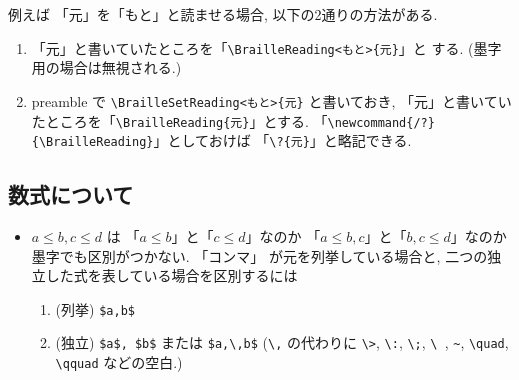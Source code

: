 \documentclass[lualatex,ja=standard,jafont=haranoaji]{bxjsarticle}
\begin{document}
例えば
「元」を「もと」と読ませる場合, 
以下の2通りの方法がある.

\begin{enumerate}
\item 「元」と書いていたところを「\verb|\BrailleReading<もと>{元}|」と
  する. (墨字用の場合は無視される.)
\item
  preamble で
\verb|\BrailleSetReading<もと>{元}| と書いておき,
「元」と書いていたところを「\verb|\BrailleReading{元}|」とする.
「\verb|\newcommand{/?}{\BrailleReading}|」としておけば
「\verb|\?{元}|」と略記できる.
\end{enumerate}


\subsection{数式について}

\begin{itemize}
\item  $a\leq b, c\leq d$ は
  「$a\leq b$」と「$c\leq d$」なのか
  「$a\leq b,c$」と「$b,c\leq d$」なのか墨字でも区別がつかない.
  「コンマ」 が元を列挙している場合と,
  二つの独立した式を表している場合を区別するには
  \begin{enumerate}
  \item (列挙) \verb|$a,b$|
  \item (独立) \verb|$a$, $b$| または \verb|$a,\,b$| (\verb|\,| の代わりに \verb|\>|, \verb|\:|, \verb|\;|, \verb|\ |, \verb|~|, \verb|\quad|, \verb|\qquad| などの空白.)
  \end{enumerate}
\end{itemize}
\end{document}
